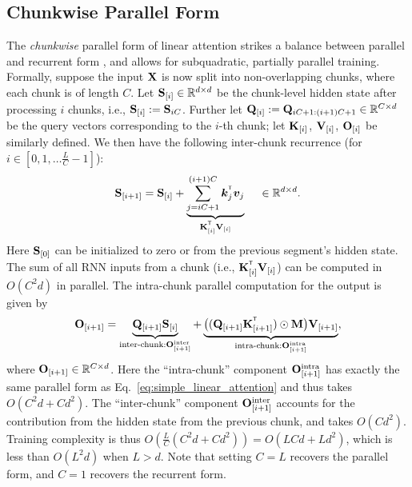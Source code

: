 \vspace{-3mm}
\subsection{Chunkwise Parallel Form} 
\vspace{-2mm}
\label{background:lin-chunkwise}

The \emph{chunkwise} parallel form of linear attention  strikes a balance between parallel and recurrent form \cite{GAU,sun2023retentive}, and allows for subquadratic, partially parallel training.
 Formally, suppose the input ${\mathbf{X}}$ is now split into non-overlapping chunks, where each chunk is of length $C$. 
Let ${\mathbf{S}}_{[i]} \in \mathbb{R}^{d \times d}$ be the chunk-level hidden state after processing $i$ chunks, i.e., ${\mathbf{S}}_{[i]}:={\mathbf{S}}_{iC}$. Further let ${\mathbf{Q}}_{[i]}:={\mathbf{Q}}_{iC+1:(i+1)C+1} \in \mathbb{R}^{C\times d}$ be the query vectors corresponding to the $i$-th chunk; let ${\mathbf{K}}_{[i]}$, ${\mathbf{V}}_{[i]}$, ${\mathbf{O}}_{[i]}$ be similarly defined. We then have the following inter-chunk recurrence (for $i \in [0, 1, \dots \frac{L}{C}-1]$):
    \begin{equation}
\rmS_{[i+1]} = \rmS_{[i]} + \underbrace{\sum_{j=iC + 1}^{(i+1)C} \vk_{j}^\intercal \vv_{j}}_{\rmK^\intercal_{[i]}\rmV_{[i]}} \quad \hspace{1mm} \in \mathbb{R}^{d\times d}.
\label{eq:la-inter-chunk}
    \end{equation}
Here  ${\mathbf{S}}_{[0]}$ can be initialized to  zero or from the previous segment's hidden state. The sum of all RNN inputs from a chunk (i.e., $\rmK^\intercal_{[i]}\rmV_{[i]}$) can be computed in $O(C^2d)$ in parallel.
The intra-chunk parallel computation for the output is given by
\begin{equation*}    
\rmO_{[i+1]} = \underbrace{\rmQ_{[i+1]}\rmS_{[i]}}_{\text{inter-chunk}: \rmO^\text{inter}_{[i+1]}} + \underbrace{\big((\rmQ_{[i+1]}\rmK_{[i+1]}^{\intercal})\odot\rmM\big)\rmV_{[i+1]}}_{\text{intra-chunk}: \rmO^{\text{intra}}_{[i+1]}},
\label{eq:la_block_wise}
\end{equation*}
where ${\mathbf{O}}_{[i+1]} \in \mathbb{R}^{C\times d}$. Here the ``intra-chunk'' component ${\mathbf{O}}^\text{intra}_{[i+1]}$  has exactly the same parallel form as Eq.~\ref{eq:simple_linear_attention} and thus takes $O(C^2d + Cd^2)$. The ``inter-chunk'' component ${\mathbf{O}}^\text{inter}_{[i+1]}$ accounts for the contribution from the hidden state from the previous chunk, and takes $O(Cd^2)$. Training complexity is thus  $O\left(\frac{L}{C}(C^2d + Cd^2) \right)=O(LCd+Ld^2)$, which is less than $O(L^2d)$ when $L>d$.  Note that setting $C = L$ recovers the parallel form, and $C=1$ recovers the recurrent form.

